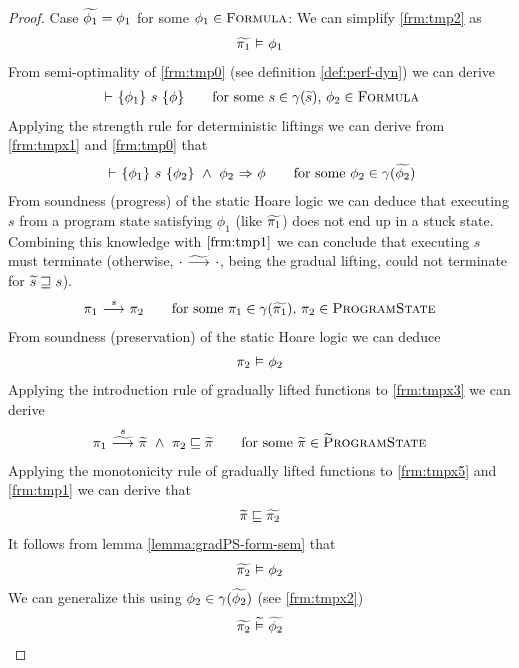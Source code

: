 \begin{proof}
    Case $\widetilde{\phi_1} = \phi_1$ for some $\phi_1 \in \textup{\textsc{Formula}}$:
        We can simplify \ref{frm:tmp2} as
        \begin{align}
        \label{frm:tmpx0}
        \evalphiGen{\grad{\pi_1}}{\phi_1}
        \end{align}
        From semi-optimality of \ref{frm:tmp0} (see definition \ref{def:perf-dyn}) we can derive
        \begin{align}
        \label{frm:tmpx1}
        \thoare{}{\phi_1}{s}{\phi}
        \quad\quad\text{for some } s \in \gamma(\grad{s}),\, \phi_2 \in \setFormula
        \end{align}
        Applying the strength rule for deterministic liftings we can derive from \ref{frm:tmpx1} and \ref{frm:tmp0} that
        \begin{align}
        \label{frm:tmpx2}
        \thoare{}{\phi_1}{s}{\phi_2} ~\wedge~ \phiImplies{\phi_2}{\phi}
        \quad\quad\text{for some } \phi_2 \in \gamma(\grad{\phi_2})
        \end{align}
        From soundness (progress) of the static Hoare logic we can deduce that executing $s$ from a program state satisfying $\phi_1$ (like $\widetilde{\pi_1}$) does not end up in a stuck state.
        Combining this knowledge with $\ref{frm:tmp1}$ we can conclude that executing $s$ must terminate (otherwise, ${\cdot} \,\,{\widetilde{\longrightarrow}^{}}\,\, {\cdot}$, being the gradual lifting, could not terminate for $\widetilde{s} \sqsupseteq s$).
        \begin{align}
        \label{frm:tmpx3}
        \sstepConsume{s}{\pi_1}{\pi_2}
        \quad\quad\text{for some } \pi_1 \in \gamma(\grad{\pi_1}),\, \pi_2 \in \setProgramState
        \end{align}
        From soundness (preservation) of the static Hoare logic we can deduce
        \begin{align}
        \label{frm:tmpx4}
        \evalphiGen{\pi_2}{\phi_2}
        \end{align}
        Applying the introduction rule of gradually lifted functions to \ref{frm:tmpx3} we can derive
        \begin{align}
        \label{frm:tmpx5}
        \gsstepConsume{s}{\pi_1}{\grad{\pi}} ~\wedge~ \pi_2 \sqsubseteq \grad{\pi}
        \quad\quad\text{for some } \grad{\pi} \in \setGProgramState
        \end{align}
        Applying the monotonicity rule of gradually lifted functions to \ref{frm:tmpx5} and \ref{frm:tmp1} we can derive that
        \begin{align}
        \label{frm:tmpx7}
        \grad{\pi} \mpt \grad{\pi_2}
        \end{align}
        It follows from lemma \ref{lemma:gradPS-form-sem} that
        \begin{align}
        \label{frm:tmpx8}
        \evalphiGen{\grad{\pi_2}}{\phi_2}
        \end{align}
        We can generalize this using $\phi_2 \in \gamma(\widetilde{\phi_2})$ (see \ref{frm:tmpx2})
        \begin{align}
        \label{frm:tmpx9}
        \evalgphiGen{\grad{\pi_2}}{\grad{\phi_2}}
        \end{align}
    

\end{proof}
